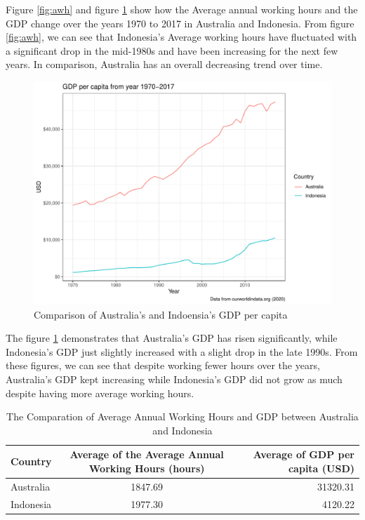 \documentclass[11pt,a4paper,]{article}
\begin{document}
Figure \ref{fig:awh} and figure \ref{fig:gdp} show how the Average annual working hours and the GDP change over the years 1970 to 2017 in Australia and Indonesia. From figure \ref{fig:awh}, we can see that Indonesia's Average working hours have fluctuated with a significant drop in the mid-1980s and have been increasing for the next few years. In comparison, Australia has an overall decreasing trend over time.

\clearpage

\begin{figure}
\centering
\includegraphics{report_files/figure-latex/gdp-1.pdf}
\caption{\label{fig:gdp}Comparison of Australia's and Indoensia's GDP per capita}
\end{figure}

The figure \ref{fig:gdp} demonstrates that Australia's GDP has risen significantly, while Indonesia's GDP just slightly increased with a slight drop in the late 1990s. From these figures, we can see that despite working fewer hours over the years, Australia's GDP kept increasing while Indonesia's GDP did not grow as much despite having more average working hours.

\begin{table}[!h]

\caption{\label{tab:mean}The Comparation of Average Annual Working Hours and GDP between Australia and Indonesia}
\centering
\begin{tabular}[t]{l|c|r}
\hline
Country & Average of the Average Annual Working Hours (hours) & Average of GDP per capita (USD)\\
\hline
Australia & 1847.69 & 31320.31\\
\hline
Indonesia & 1977.30 & 4120.22\\
\hline
\end{tabular}
\end{table}
\end{document}
